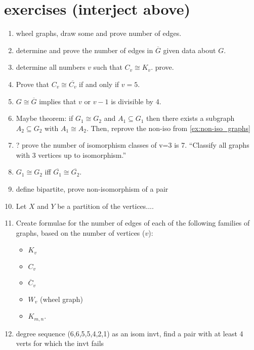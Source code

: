 \section*{exercises (interject above)}
\begin{enumerate}
    \item wheel graphs, draw some and prove number of edges.
    \item determine and prove the number of edges in $\overline{G}$ given data about $G$.
    \item determine all numbers $v$ such that $C_v \cong K_v$. prove.
    \item Prove that $C_v \cong \overline{C_v}$ if and only if $v = 5$.
    \item $G \cong \overline{G}$ implies that $v$ or $v-1$ is divisible by 4.
    \item Maybe theorem: if $G_1 \cong G_2$ and $A_1 \subseteq G_1$ then there exists a subgraph $A_2 \subseteq G_2$ with $A_1 \cong A_2$.  Then, reprove the non-iso from \ref{ex:non-iso_graphs}
    \item ? prove the number of isomorphism classes of v=3 is 7.  ``Classify all graphs with 3 vertices up to isomorphism.''
    \item $G_1 \cong G_2$ iff $\overline{G_1} \cong \overline{G_2}$.
    \item define bipartite, prove non-isomorphism of a pair
        \item Let $X$ and $Y$ be a partition of the vertices....
    \item Create formulae for the number of edges of each of the following families of graphs, based on the number of vertices ($v$):
    \begin{itemize}
        \item $K_v$
        \item $C_v$
        \item $\overline{C}_v$
        \item $W_v$ (wheel graph)
        \item $K_{m,n}$.
    \end{itemize}

    \item degree sequence (6,6,5,5,4,2,1) as an isom invt, find a pair with at least 4 verts for which the invt fails

\end{enumerate}
